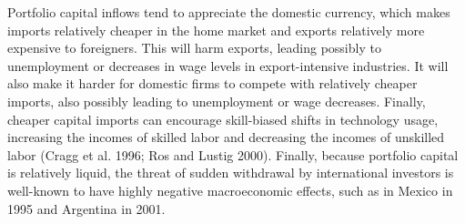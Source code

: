 \documentclass[a4paper]{article}\usepackage[]{graphicx}\usepackage[]{color}
\begin{document}
Portfolio capital inflows tend to appreciate the domestic currency, which makes imports relatively cheaper in the home market and exports relatively more expensive to foreigners. This will harm exports, leading possibly to unemployment or decreases in wage levels in export-intensive industries. It will also make it harder for domestic firms to compete with relatively cheaper imports, also possibly leading to unemployment or wage decreases. Finally, cheaper capital imports can encourage skill-biased shifts in technology usage, increasing the incomes of skilled labor and decreasing the incomes of unskilled labor (Cragg et al. 1996; Ros and Lustig 2000). Finally, because portfolio capital is relatively liquid, the threat of sudden withdrawal by international investors is well-known to have highly negative macroeconomic effects, such as in Mexico in 1995 and Argentina in 2001.
\end{document}
